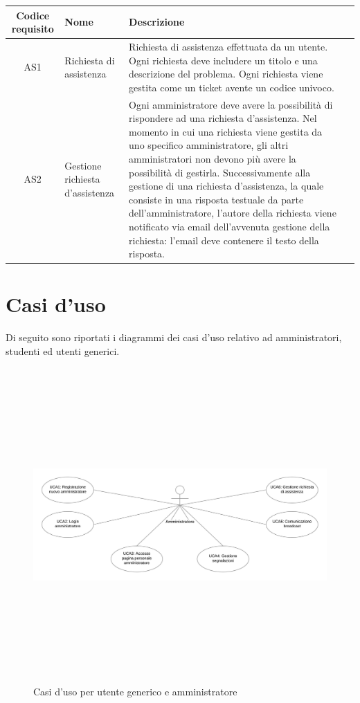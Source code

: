 \documentclass[10pt,a4paper]{report}
\begin{document}
	\begin{tabular}{cp{3cm}p{9cm}p{1cm}}
		Codice requisito&Nome&Descrizione\\ \hline
		AS1&Richiesta di assistenza&Richiesta di assistenza effettuata da un utente. Ogni richiesta deve includere un titolo e una descrizione del problema. Ogni richiesta viene gestita come un ticket avente un codice univoco.\\ \hline
		AS2&Gestione richiesta d'assistenza&Ogni amministratore deve avere la possibilità di rispondere ad una richiesta d'assistenza. Nel momento in cui una richiesta viene gestita da uno specifico amministratore, gli altri amministratori non devono più avere la possibilità di gestirla. Successivamente alla gestione di una richiesta d'assistenza, la quale consiste in una risposta testuale da parte dell'amministratore, l'autore della richiesta viene notificato via email dell'avvenuta gestione della richiesta: l'email deve contenere il testo della risposta.
	\end{tabular}
	
	\section{Casi d'uso}
	Di seguito sono riportati i diagrammi dei casi d'uso relativo ad amministratori, studenti ed utenti generici.
	
	\begin{figure}[H]
		\centering
		\includegraphics[height=12cm, width=17cm, keepaspectratio]{gua_uc}
		\caption{Casi d'uso per utente generico e amministratore}
	\end{figure}
\end{document}
